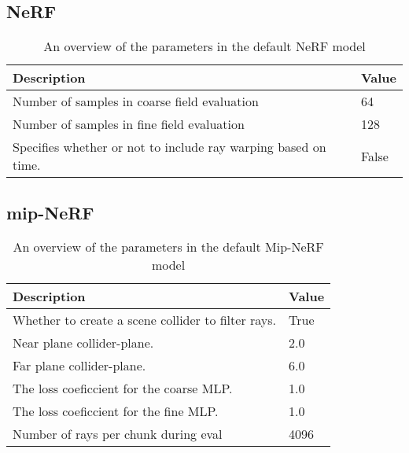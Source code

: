 \subsection{NeRF}
\begin{table}[h]
    \begin{tabular}{|l|l|}
    \hline
    \textbf{Description} & \textbf{Value} \\ 
    \hline
    Number of samples in coarse field evaluation & 64 \\
    Number of samples in fine field evaluation & 128 \\
    Specifies whether or not to include ray warping based on time. & False \\
    \hline
    \end{tabular}
    \caption{An overview of the parameters in the default NeRF model}
    \label{tab:nerf-parameter-overview}
\end{table}

\subsection{mip-NeRF}
\begin{table}[h]
    \begin{tabular}{|l|l|}
    \hline
    \textbf{Description} & \textbf{Value} \\ 
    \hline
    Whether to create a scene collider to filter rays.  & True \\
    Near plane collider-plane.                          & 2.0 \\
    Far plane collider-plane.                           & 6.0 \\
    The loss coeficcient for the coarse MLP.            & 1.0 \\
    The loss coeficcient for the fine MLP.              & 1.0 \\
    Number of rays per chunk during eval                & 4096 \\
    \hline
    \end{tabular}
    \caption{An overview of the parameters in the default Mip-NeRF model}
    \label{tab:mip-nerf-parameter-overview}
\end{table}


